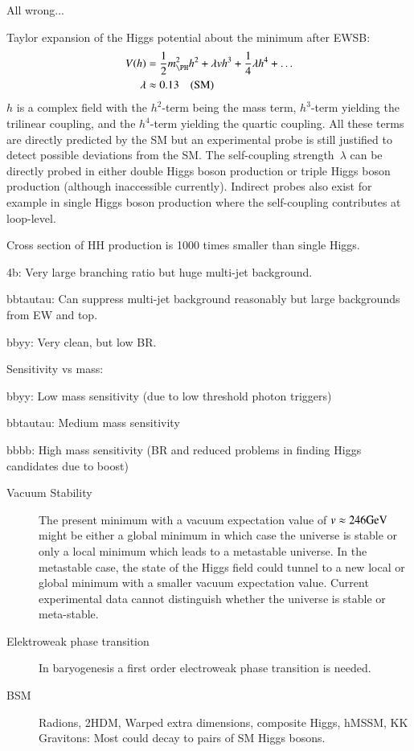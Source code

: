 
All wrong...

Taylor expansion of the Higgs potential about the minimum after EWSB:
\begin{align*}
  V(h) &= \frac{1}{2} m_{\PH}^2 h^2 + \lambda v h^3 + \frac{1}{4} \lambda h^4 + \dots \\
  \lambda &\approx 0.13 \quad \text{(SM)}
\end{align*}
$h$ is a complex field with the $h^2$-term being the mass term,
$h^3$-term yielding the trilinear coupling, and the $h^4$-term
yielding the quartic coupling. All these terms are directly predicted
by the SM but an experimental probe is still justified to detect
possible deviations from the SM. The self-coupling strength~$\lambda$
can be directly probed in either double Higgs boson production or
triple Higgs boson production (although inaccessible
currently). Indirect probes also exist for example in single Higgs
boson production where the self-coupling contributes at loop-level.

Cross section of HH production is 1000 times smaller than single
Higgs. 


4b: Very large branching ratio but huge multi-jet background.

bbtautau: Can suppress multi-jet background reasonably but large
backgrounds from EW and top.

bbyy: Very clean, but low BR.

Sensitivity vs mass:

bbyy: Low mass sensitivity (due to low threshold photon triggers)

bbtautau: Medium mass sensitivity

bbbb: High mass sensitivity (BR and reduced problems in finding Higgs
candidates due to boost)

\begin{description}

\item[Vacuum Stability] The present minimum with a vacuum expectation
  value of $v \approx \si{246}{\ensuremath{\text{GeV}}}$ might be either a global minimum
  in which case the universe is stable or only a local minimum which
  leads to a metastable universe. In the metastable case, the state of
  the Higgs field could tunnel to a new local or global minimum with a
  smaller vacuum expectation value. Current experimental data cannot
  distinguish whether the universe is stable or
  meta-stable.

\item[Elektroweak phase transition] In baryogenesis a first order
  electroweak phase transition is needed.

\item[BSM] Radions, 2HDM, Warped extra dimensions, composite Higgs, hMSSM, KK
  Gravitons: Most could decay to pairs of SM Higgs bosons.

\end{description}

